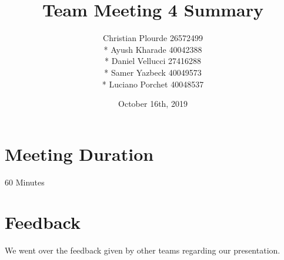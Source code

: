 \documentclass{article}
\begin{document}
\title{Team Meeting 4 Summary}
\author{Christian Plourde 26572499\\*
		Ayush Kharade 40042388\\*
		Daniel Vellucci 27416288\\*
		Samer Yazbeck 40049573\\*
		Luciano Porchet 40048537
		}
\date{October 16th, 2019}

\maketitle

\newpage

\section{Meeting Duration}
60 Minutes

\section{Feedback}
We went over the feedback given by other teams regarding our presentation.
\end{document}
